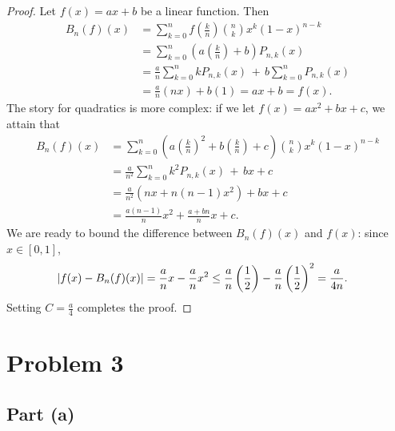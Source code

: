\documentclass[11pt]{article}
\begin{document}
\begin{proof}
  Let $f(x) = ax + b$ be a linear function. Then
  \begin{align*}
    B_{n}(f)(x) & = \sum\limits_{k = 0}^{n} f \left( \frac{k}{n} \right) \binom{n}{k} x^{k} (1 - x)^{n - k} \\
                & = \sum\limits_{k = 0}^{n} \left( a \left( \tfrac{k}{n} \right) + b \right) P_{n, k}(x) \\
                & = \frac{a}{n} \sum\limits_{k = 0}^{n} k P_{n, k}(x) \, + \, b \sum\limits_{k = 0}^{n} P_{n, k}(x) \\
                & = \frac{a}{n} (nx) + b (1) = ax + b = f(x).
  \end{align*}
  The story for quadratics is more complex: if we let $f(x) = ax^{2} + bx + c$, we attain that
  \begin{align*}
    B_{n}(f)(x) & = \sum\limits_{k = 0}^{n} \left( a \left( \tfrac{k}{n} \right)^{2} + b \left( \tfrac{k}{n} \right) + c \right) \binom{n}{k} x^{k} (1 - x)^{n - k} \\
                & = \frac{a}{n^{2}} \sum\limits_{k = 0}^{n} k^{2} P_{n, k}(x) \, + \, bx + c \\
                & = \frac{a}{n^{2}} \left( nx + n(n - 1)x^{2} \right) + bx + c \\
                &= \frac{a(n - 1)}{n} x^{2} + \frac{a + bn}{n} x + c.
  \end{align*}
  We are ready to bound the difference between $B_{n}(f)(x)$ and $f(x)$: since $x \in [0, 1]$,
  \begin{align*}
    \abs{f(x) - B_{n}(f)(x)} & = \frac{a}{n}x - \frac{a}{n}x^{2} \le \frac{a}{n} \left( \frac{1}{2} \right) - \frac{a}{n} \left( \frac{1}{2} \right)^{2} = \frac{a}{4n}.
  \end{align*}
  Setting $C = \tfrac{a}{4}$ completes the proof.
\end{proof}


\section{Problem 3}


\subsection{Part (a)}
\end{document}
